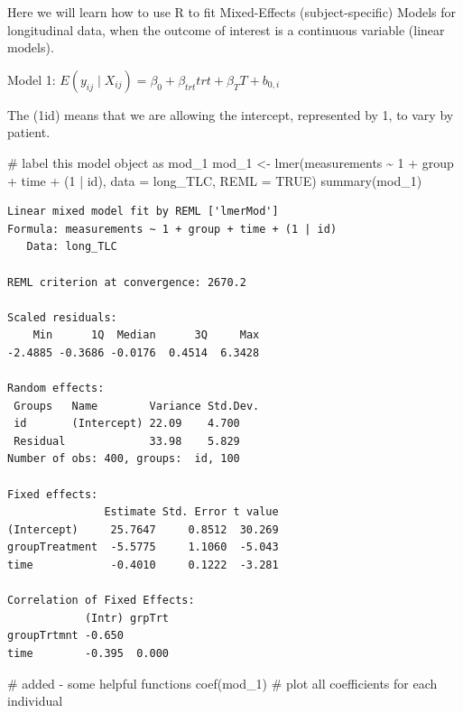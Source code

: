 \documentclass[
  letterpaper,
  DIV=11,
  numbers=noendperiod]{scrreprt}
\newenvironment{Shaded}{\begin{snugshade}}{\end{snugshade}}
\newcommand{\AttributeTok}[1]{\textcolor[rgb]{0.40,0.45,0.13}{#1}}
\newcommand{\CommentTok}[1]{\textcolor[rgb]{0.37,0.37,0.37}{#1}}
\newcommand{\ConstantTok}[1]{\textcolor[rgb]{0.56,0.35,0.01}{#1}}
\newcommand{\DecValTok}[1]{\textcolor[rgb]{0.68,0.00,0.00}{#1}}
\newcommand{\FunctionTok}[1]{\textcolor[rgb]{0.28,0.35,0.67}{#1}}
\newcommand{\NormalTok}[1]{\textcolor[rgb]{0.00,0.23,0.31}{#1}}
\newcommand{\OtherTok}[1]{\textcolor[rgb]{0.00,0.23,0.31}{#1}}
\newcommand{\SpecialCharTok}[1]{\textcolor[rgb]{0.37,0.37,0.37}{#1}}
\begin{document}
Here we will learn how to use R to fit Mixed-Effects (subject-specific)
Models for longitudinal data, when the outcome of interest is a
continuous variable (linear models).

\begin{center}
Model 1: $E(y_{ij} \mid X_{ij}) = \beta_0 +  \beta_{trt}trt +  \beta_{T}T + b_{0,i}$
\end{center}

The (1\textbar id) means that we are allowing the intercept, represented
by 1, to vary by patient.

\begin{Shaded}
\begin{Highlighting}[]
\CommentTok{\# label this model object as mod\_1}
\NormalTok{mod\_1 }\OtherTok{\textless{}{-}} \FunctionTok{lmer}\NormalTok{(measurements }\SpecialCharTok{\textasciitilde{}} \DecValTok{1} \SpecialCharTok{+}\NormalTok{ group }\SpecialCharTok{+}\NormalTok{ time }\SpecialCharTok{+}\NormalTok{ (}\DecValTok{1} \SpecialCharTok{|}\NormalTok{ id), }\AttributeTok{data =}\NormalTok{ long\_TLC, }\AttributeTok{REML =} \ConstantTok{TRUE}\NormalTok{)}
\FunctionTok{summary}\NormalTok{(mod\_1)}
\end{Highlighting}
\end{Shaded}

\begin{verbatim}
Linear mixed model fit by REML ['lmerMod']
Formula: measurements ~ 1 + group + time + (1 | id)
   Data: long_TLC

REML criterion at convergence: 2670.2

Scaled residuals: 
    Min      1Q  Median      3Q     Max 
-2.4885 -0.3686 -0.0176  0.4514  6.3428 

Random effects:
 Groups   Name        Variance Std.Dev.
 id       (Intercept) 22.09    4.700   
 Residual             33.98    5.829   
Number of obs: 400, groups:  id, 100

Fixed effects:
               Estimate Std. Error t value
(Intercept)     25.7647     0.8512  30.269
groupTreatment  -5.5775     1.1060  -5.043
time            -0.4010     0.1222  -3.281

Correlation of Fixed Effects:
            (Intr) grpTrt
groupTrtmnt -0.650       
time        -0.395  0.000
\end{verbatim}

\begin{Shaded}
\begin{Highlighting}[]
\CommentTok{\# added {-} some helpful functions}
\FunctionTok{coef}\NormalTok{(mod\_1)  }\CommentTok{\# plot all coefficients for each individual}
\end{Highlighting}
\end{Shaded}
\end{document}
